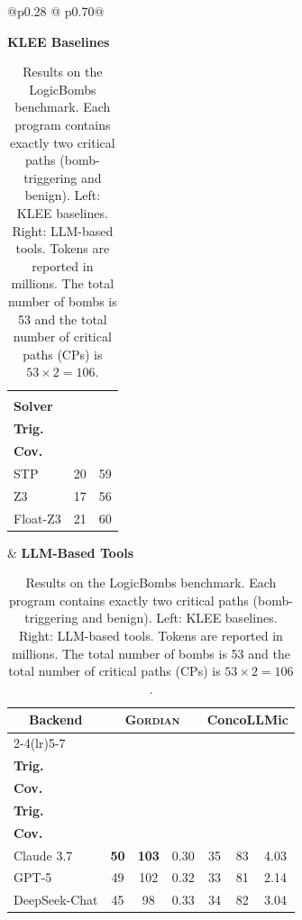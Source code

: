 \documentclass[acmsmall]{acmart}
\newcommand{\projName}{\textsc{Gordian}\xspace}
\theoremstyle{definition}
\begin{document}
\begin{table}[t!]
\centering
\caption{Results on the LogicBombs benchmark.
Each program contains exactly two critical paths (bomb-triggering and benign).
Left: KLEE baselines.
Right: LLM-based tools.
Tokens are reported in millions.
The total number of bombs is 53 and the total number of critical paths (CPs) is
$53 \times 2 = 106$.}
\label{tab:logic-bombs-summary}
\footnotesize
\vspace{-2mm}
\begin{tabular}{@{}p{}
@{\hspace{0.00\columnwidth}}
p{}@{}}

\raggedright
\centering\textbf{KLEE Baselines}\par\vspace{2pt}
\centering
\begin{tabular}{|l|cc|}
\toprule
\multicolumn{3}{|c|}{\rule{0pt}{3.2ex}} \\  %
\textbf{Solver}
& \makecell{\textbf{Bombs}\\\textbf{Trig.}}
& \makecell{\textbf{CPs}\\\textbf{Cov.}} \\
\midrule
STP        & 20 & 59 \\
Z3         & 17 & 56 \\
Float-Z3   & 21 & 60 \\
\bottomrule
\end{tabular}

&
\centering\textbf{LLM-Based Tools}\par\vspace{2pt}
\centering
\begin{tabular}{|l|ccc|ccc|}
\toprule
\multicolumn{1}{|c|}{\textbf{Backend}}
& \multicolumn{3}{c|}{\textbf{\projName{}}}
& \multicolumn{3}{c|}{\textbf{ConcoLLMic}} \\
\cmidrule(lr){2-4}\cmidrule(lr){5-7}
& \makecell{\textbf{Bombs}\\\textbf{Trig.}}
& \makecell{\textbf{CPs}\\\textbf{Cov.}}
& \makecell{\textbf{Tokens}}
& \makecell{\textbf{Bombs}\\\textbf{Trig.}}
& \makecell{\textbf{CPs}\\\textbf{Cov.}}
& \makecell{\textbf{Tokens}} \\
\midrule
Claude 3.7
& \textbf{50} & \textbf{103} & 0.30
& 35 & 83 & 4.03 \\

GPT-5
& 49 & 102 & 0.32
& 33 & 81 & 2.14 \\

DeepSeek-Chat
& 45 & 98 & 0.33
& 34 & 82 & 3.04 \\
\bottomrule
\end{tabular}

\end{tabular}
\vspace{-4mm}
\end{table}
\end{document}
